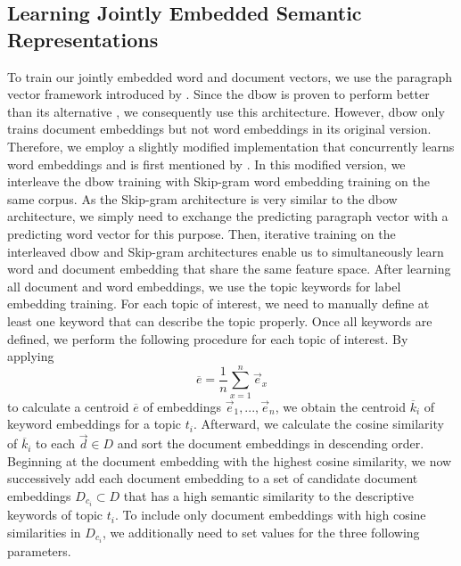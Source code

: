 \documentclass[a4paper,twoside]{article}
\begin{document}
\subsection{Learning Jointly Embedded Semantic Representations}

To train our jointly embedded word and document vectors, we use the paragraph vector framework introduced by \citet{Le-Mikolov-2014}. Since the \ac{dbow} is proven to perform better than its alternative \citep{lau-baldwin-2016-empirical}, we consequently use this architecture. However, \ac{dbow} only trains document embeddings but not word embeddings in its original version. Therefore, we employ a slightly modified implementation that concurrently learns word embeddings and is first mentioned by \citet{dai2015document}. In this modified version, we interleave the \ac{dbow} training with Skip-gram \citep{mikolov2013efficient} word embedding training on the same corpus. As the Skip-gram architecture is very similar to the \ac{dbow} architecture, we simply need to exchange the predicting paragraph vector with a predicting word vector for this purpose. Then, iterative training on the interleaved \ac{dbow} and Skip-gram architectures enable us to simultaneously learn word and document embedding that share the same feature space. \newline
\newline After learning all document and word embeddings, we use the topic keywords for label embedding training. For each topic of interest, we need to manually define at least one keyword that can describe the topic properly. Once all keywords are defined, we perform the following procedure for each topic of interest. By applying
\begin{equation}
    \overline{e}=\frac{1}{n} \sum_{x=1}^{n} \vec{{e}}_{x}
\end{equation}
to calculate a centroid $\overline{e}$ of embeddings ${\vec{{e}}_{1},...,\vec{{e}}_{n}}$, we obtain the centroid $\overline{k}_{i}$ of keyword embeddings for a topic $t_{i}$.
Afterward, we calculate the cosine similarity of $\overline{k}_{i}$ to each $\vec{d} \in D$ and sort the document embeddings in descending order. Beginning at the document embedding with the highest cosine similarity, we now successively add each document embedding to a set of candidate document embeddings $D_{{c}_{i}} \subset D$ that has a high semantic similarity to the descriptive keywords of topic $t_i$. To include only document embeddings with high cosine similarities in $D_{{c}_{i}}$, we additionally need to set values for the three following parameters.
\end{document}
